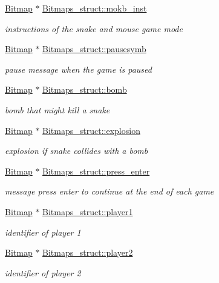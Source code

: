 \begin{DoxyCompactItemize}
\hyperlink{structBitmap}{Bitmap} $\ast$ \hyperlink{group__graphics_gaa403b7ac82d3c61224b7064f29790bd3}{Bitmaps\+\_\+struct\+::mokb\+\_\+inst}
\begin{DoxyCompactList}\small\item\em instructions of the snake and mouse game mode \end{DoxyCompactList}\item 
\hyperlink{structBitmap}{Bitmap} $\ast$ \hyperlink{group__graphics_ga3b47ad4f61b00c3e5527f2bec90890b5}{Bitmaps\+\_\+struct\+::pausesymb}
\begin{DoxyCompactList}\small\item\em pause message when the game is paused \end{DoxyCompactList}\item 
\hyperlink{structBitmap}{Bitmap} $\ast$ \hyperlink{group__graphics_ga86313247313ec7e1e264d13835d7d012}{Bitmaps\+\_\+struct\+::bomb}
\begin{DoxyCompactList}\small\item\em bomb that might kill a snake \end{DoxyCompactList}\item 
\hyperlink{structBitmap}{Bitmap} $\ast$ \hyperlink{group__graphics_gac0df1ce2b02d6d52203766b8cb13c9bf}{Bitmaps\+\_\+struct\+::explosion}
\begin{DoxyCompactList}\small\item\em explosion if snake collides with a bomb \end{DoxyCompactList}\item 
\hyperlink{structBitmap}{Bitmap} $\ast$ \hyperlink{group__graphics_gaf891e78c1cd9b89f53a3cf6032f88e71}{Bitmaps\+\_\+struct\+::press\+\_\+enter}
\begin{DoxyCompactList}\small\item\em message press enter to continue at the end of each game \end{DoxyCompactList}\item 
\hyperlink{structBitmap}{Bitmap} $\ast$ \hyperlink{group__graphics_ga279ac50f42320cb39cbc02270e40597a}{Bitmaps\+\_\+struct\+::player1}
\begin{DoxyCompactList}\small\item\em identifier of player 1 \end{DoxyCompactList}\item 
\hyperlink{structBitmap}{Bitmap} $\ast$ \hyperlink{group__graphics_gaaee24419ba914b7d473d1f5e06d84272}{Bitmaps\+\_\+struct\+::player2}
\begin{DoxyCompactList}\small\item\em identifier of player 2 \end{DoxyCompactList}\item 

\end{DoxyCompactItemize}
